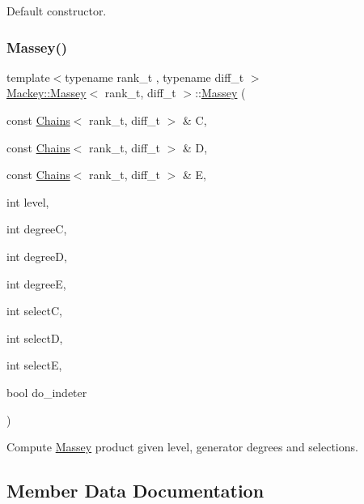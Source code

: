 Default constructor. 

\mbox{\label{classMackey_1_1Massey_ab9dccd95db4477c103e1e790f6796735}} 
\subsubsection{\texorpdfstring{Massey()}{Massey()}\hspace{0.1cm}{\footnotesize\ttfamily [2/2]}}
{\footnotesize\ttfamily template$<$typename rank\+\_\+t , typename diff\+\_\+t $>$ \\
\hyperlink{classMackey_1_1Massey}{Mackey\+::\+Massey}$<$ rank\+\_\+t, diff\+\_\+t $>$\+::\hyperlink{classMackey_1_1Massey}{Massey} (\begin{DoxyParamCaption}\item[{const \hyperlink{classMackey_1_1Chains}{Chains}$<$ rank\+\_\+t, diff\+\_\+t $>$ \&}]{C,  }\item[{const \hyperlink{classMackey_1_1Chains}{Chains}$<$ rank\+\_\+t, diff\+\_\+t $>$ \&}]{D,  }\item[{const \hyperlink{classMackey_1_1Chains}{Chains}$<$ rank\+\_\+t, diff\+\_\+t $>$ \&}]{E,  }\item[{int}]{level,  }\item[{int}]{degreeC,  }\item[{int}]{degreeD,  }\item[{int}]{degreeE,  }\item[{int}]{selectC,  }\item[{int}]{selectD,  }\item[{int}]{selectE,  }\item[{bool}]{do\+\_\+indeter }\end{DoxyParamCaption})}



Compute \hyperlink{classMackey_1_1Massey}{Massey} product given level, generator degrees and selections. 



\subsection{Member Data Documentation}
\mbox{\label{classMackey_1_1Massey_ab738306412d735a31df4913c20948d65}} 
